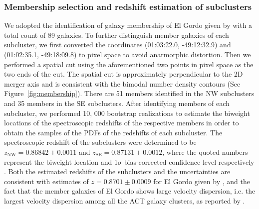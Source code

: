 \subsubsection{Membership selection and redshift estimation of subclusters}
We adopted the identification of galaxy membership of El Gordo given by
 with a total count of 89 galaxies.
To further distinguish member galaxies of each subcluster, we first
converted the coordinates (01:03:22.0,
-49:12:32.9) and (01:02:35.1, -49:18:09.8) to pixel space to
avoid anarmorphic distortion. Then we performed a spatial cut using the
aforementioned two points in pixel space as the two ends of the cut. The
spatial cut is approximately perpendicular to the 2D merger axis and is consistent with
the bimodal number density contours (See Figure~\ref{fig:membership}). 
There are 51 members identified in the NW subclusters and 35 members in the SE
subclusters. 
After identifying members of each subcluster, we performed 10, 000 bootstrap realizations to estimate the biweight
locations of the spectroscopic redshifts of the respective members in order
to obtain the samples of the PDFs of the redshifts of each subcluster. 
The spectroscopic redshift of the subclusters were
determined to be 
$z_{\mathrm{NW}} = 0.86842 \pm 0.0011$ and 
$z_{\mathrm{SE}} = 0.87131 \pm 0.0012$, where the quoted numbers represent the
biweight location and 1$\sigma$ bias-corrected confidence level
respectively \citep{Beers90}.  
Both the estimated redshifts of the subclusters and the uncertainties are
consistent with estimates of $z=0.8701 \pm 0.0009$ for El Gordo given by \citealt{Sifon13}, and the fact that the
member galaxies of El
Gordo shows large velocity dispersion, i.e. the largest velocity
dispersion among all the ACT galaxy clusters, as reported by
.

